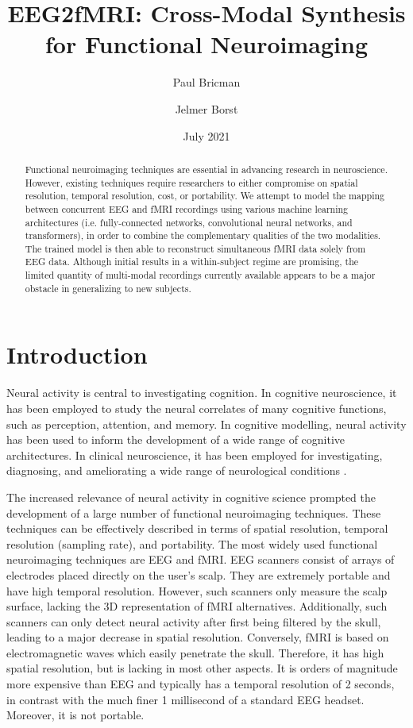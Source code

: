 \documentclass{article}
\title{EEG2fMRI: Cross-Modal Synthesis for Functional Neuroimaging}
\author{Paul Bricman}
\author{Jelmer Borst}
\affil{University of Groningen}
\date{July 2021}
\begin{document}
\maketitle

\begin{abstract}
    Functional neuroimaging techniques are essential in advancing research in neuroscience. However, existing techniques require researchers to either compromise on spatial resolution, temporal resolution, cost, or portability. We attempt to model the  mapping between concurrent EEG and fMRI recordings using various machine learning architectures (i.e. fully-connected networks, convolutional neural networks, and transformers), in order to combine the complementary qualities of the two modalities. The trained model is then able to reconstruct simultaneous fMRI data solely from EEG data. Although initial results in a within-subject regime are promising, the limited quantity of multi-modal recordings currently available appears to be a major obstacle in generalizing to new subjects.
\end{abstract}

\section{Introduction}

Neural activity is central to investigating cognition. In cognitive neuroscience, it has been employed to study the neural correlates of many cognitive functions, such as perception, attention, and memory. In cognitive modelling, neural activity has been used to inform the development of a wide range of cognitive architectures. In clinical neuroscience, it has been employed for investigating, diagnosing, and ameliorating a wide range of neurological conditions \cite{n_functional_2015}.

The increased relevance of neural activity in cognitive science prompted the development of a large number of functional neuroimaging techniques. These techniques can be effectively described in terms of spatial resolution, temporal resolution (sampling rate), and portability. The most widely used functional neuroimaging techniques are EEG and fMRI. EEG scanners consist of arrays of electrodes placed directly on the user's scalp. They are extremely portable and have high temporal resolution. However, such scanners only measure the scalp surface, lacking the 3D representation of fMRI alternatives. Additionally, such scanners can only detect neural activity after first being filtered by the skull, leading to a major decrease in spatial resolution. Conversely, fMRI is based on electromagnetic waves which easily penetrate the skull. Therefore, it has high spatial resolution, but is lacking in most other aspects. It is orders of magnitude more expensive than EEG and typically has a temporal resolution of 2 seconds, in contrast with the much finer 1 millisecond of a standard EEG headset. Moreover, it is not portable.
\end{document}
